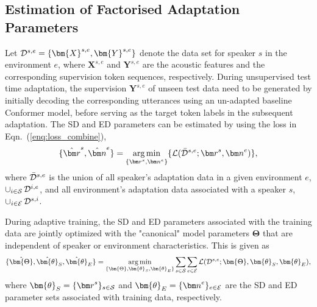 \documentclass{INTERSPEECH2023}
\begin{document}
\vspace{-0.3cm}
\subsection{Estimation of Factorised Adaptation Parameters}
Let ${\cal{D}}^{s,e}=\{\bm{X}^{s,e},\bm{Y}^{s,e}\}$ denote the data set for speaker $s$ in the environment $e$, where $\bm{X}^{s,e}$ and $\bm{Y}^{s,e}$ are the acoustic features and the corresponding supervision token sequences, respectively. During unsupervised test time adaptation, the supervision $\bm{Y}^{s,e}$ of unseen test data need to be generated by initially decoding the corresponding utterances using an un-adapted baseline Conformer model, before serving as the target token labels in the subsequent adaptation. The SD and ED parameters can be estimated by using the loss in Eqn.~(\ref{enq:loss_combine}), 
\begin{align}
\setlength{\abovedisplayskip}{0pt plus 1pt minus 2pt}
\setlength{\belowdisplayskip}{0pt plus 1pt minus 2pt}
\{\hat{{\bm r}}^s, \hat{{\bm n}}^e\} = \mathop{\arg\min}\limits_{\{{\bm r}^s, {\bm n}^e\}}\{{\cal L}(\bar{\cal D}^{s,e};{\bm r}^s, {\bm n}^e)\},
\end{align}
where $\bar{\cal D}^{s,e}$ is the union of all speaker's adaptation data in a given environment $e$, $\mathop{\cup}_{i\in{\cal S}}{\cal{D}}^{i,e}$, and all environment's adaptation data associated with a speaker $s$, $\mathop{\cup}_{i\in{\cal E}}{\cal{D}}^{s,i}$. 

During adaptive training, the SD and ED parameters associated with the training data are jointly optimized with the "canonical" model parameters $\bm{\Theta}$ that are independent of speaker or environment characteristics. This is given as  
\begin{align}
\setlength{\abovedisplayskip}{0pt plus 1pt minus 2pt}
\setlength{\belowdisplayskip}{0pt plus 1pt minus 2pt}
\{\hat{{\bm{\Theta}}}, \hat{\bm{\theta}}_{S}, \hat{\bm{\theta}}_{E}\} = \mathop{\arg\min}_{\{{{\bm{\Theta}}}, {\bm{\theta}}_{S}, {\bm{\theta}}_{E}\} }\sum_{s\in{\cal S}}\sum_{e\in{\cal E}} {\cal L}({\cal D}^{s,e}; {{\bm{\Theta}}}, {\bm{\theta}}_{S}, {\bm{\theta}}_{E}), 
\end{align}
where $\bm{\theta}_{S}=\{{\bm r}^{s}\}_{s\in{\cal S}}$ and $\bm{\theta}_{E}=\{{\bm n}^{e}\}_{e\in{\cal E}}$ are the SD and ED parameter sets associated with training data, respectively. 
\end{document}
